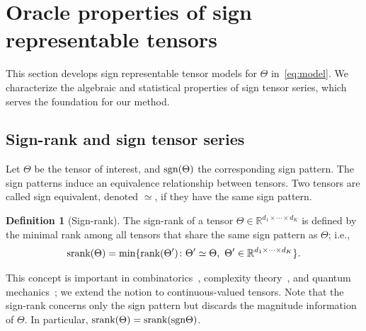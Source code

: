 \documentclass{article}
\theoremstyle{plain}
\theoremstyle{definition}
\newtheorem{defn}{Definition}
\def\sign{\textup{sgn}}
\def\srank{\textup{srank}}
\def\rank{\textup{rank}}
\begin{document}
\section{Oracle properties of sign representable tensors}\label{sec:representation}
This section develops sign representable tensor models for $\Theta$ in~\eqref{eq:model}. We characterize the algebraic and statistical properties of sign tensor series, which serves the foundation for our method. 


\subsection{Sign-rank and sign tensor series}\label{sec:sign-rank}
Let $\Theta$ be the tensor of interest, and $\sign (\Theta)$ the corresponding sign pattern. The sign patterns induce an equivalence relationship between tensors. Two tensors are called sign equivalent, denoted $\simeq$, if they have the same sign pattern.

\vspace{.1cm}
\begin{defn}[Sign-rank]
The sign-rank of a tensor $\Theta\in\mathbb{R}^{d_1\times \cdots \times d_K}$ is defined by the minimal rank among all tensors that share the same sign pattern as $\Theta$; i.e.,
\[
\srank(\Theta) = \min \{\rank(\Theta')\colon  \Theta'\simeq \Theta,\ \Theta'\in\mathbb{R}^{d_1\times \cdots \times d_K}\}.
\]
\end{defn}
This concept is important in combinatorics~\citep{cohn2013fast}, complexity theory~\citep{alon2016sign}, and quantum mechanics~\citep{de2003nondeterministic}; we extend the notion to continuous-valued tensors. Note that the sign-rank concerns only the sign pattern but discards the magnitude information of $\Theta$. In particular, $\srank(\Theta)=\srank(\sign \Theta)$. 
\end{document}

